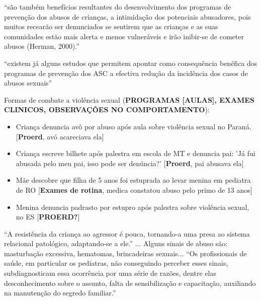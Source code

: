 ``são também benefícios resultantes do desenvolvimento dos programas de prevenção dos abusos de crianças, a intimidação dos potenciais abusadores, pois muitos recearão ser denunciados se sentirem que as crianças e as suas comunidades estão mais alerta e menos vulneráveis e irão inibir-se de cometer abusos (Herman, 2000).'' \cite{maria2010papel}

``existem já alguns estudos que permitem apontar como consequência benéfica dos programas de prevenção dos ASC a efectiva redução da incidência dos casos de abusos sexuais''\cite{maria2010papel}


Formas de combate a violência sexual (\textbf{PROGRAMAS [AULAS], EXAMES CLINICOS, OBSERVAÇÕES NO COMPORTAMENTO}):

\begin{itemize}
  \item Criança denuncia avô por abuso após aula sobre violência sexual no Paraná. \cite{central2019crianca} [\textbf{Proerd}, avó acareciava ela]
  \item Criança escreve bilhete após palestra em escola de MT e denuncia pai: 'Já fui abusada pelo meu pai, isso pode ser denúncia?' \cite{lidiane2018crianca} [\textbf{Proerd}, pai abusava ela]
  \item Mãe descobre que filha de 5 anos foi estuprada ao levar menina em pediatra de RO \cite{jonatas2018crianca} [\textbf{Exames de rotina}, medica constatou abuso pelo primo de 13 anos]
  \item Menina denuncia padrasto por estupro após palestra sobre violência sexual, no ES [\textbf{PROERD?}]
\end{itemize}









``A resistência da criança ao agressor é pouca, tornando-a uma presa ao sistema relacional patológico, adaptando-se a ele.'' ... Alguns sinais de abuso são: masturbação excessiva, hematomas, brincadeiras sexuais... ``Os profissionais de saúde, em particular os pediatras, não conseguindo perceber esses sinais, subdiagnosticam essa ocorrência por uma série de razões, dentre elas desconhecimento sobre o assunto, falta de sensibilização e capacitação, auxiliando na manutenção do segredo familiar.'' \cite{pavao2013impasse}



